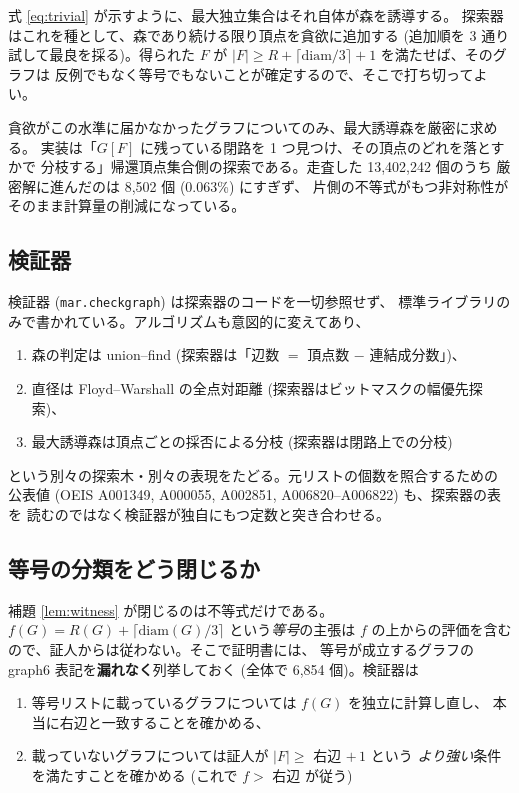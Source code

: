 \documentclass[paper=a4,fontsize=10.5pt,jafontsize=10.5pt]{jlreq}
\theoremstyle{plain}
\theoremstyle{definition}
\begin{document}
式 \eqref{eq:trivial} が示すように、最大独立集合はそれ自体が森を誘導する。
探索器はこれを種として、森であり続ける限り頂点を貪欲に追加する
(追加順を 3 通り試して最良を採る)。得られた $F$ が
$|F| \ge R + \lceil \mathrm{diam}/3 \rceil + 1$ を満たせば、そのグラフは
反例でもなく等号でもないことが確定するので、そこで打ち切ってよい。

貪欲がこの水準に届かなかったグラフについてのみ、最大誘導森を厳密に求める。
実装は「$G[F]$ に残っている閉路を 1 つ見つけ、その頂点のどれを落とすかで
分枝する」帰還頂点集合側の探索である。走査した 13,402,242 個のうち
厳密解に進んだのは 8,502 個 (0.063\%) にすぎず、
片側の不等式がもつ非対称性がそのまま計算量の削減になっている。

\subsection{検証器}

検証器 (\texttt{mar.checkgraph}) は探索器のコードを一切参照せず、
標準ライブラリのみで書かれている。アルゴリズムも意図的に変えてあり、

\begin{enumerate}
\item 森の判定は union--find (探索器は「辺数 $=$ 頂点数 $-$ 連結成分数」)、
\item 直径は Floyd--Warshall の全点対距離 (探索器はビットマスクの幅優先探索)、
\item 最大誘導森は頂点ごとの採否による分枝 (探索器は閉路上での分枝)
\end{enumerate}

という別々の探索木・別々の表現をたどる。元リストの個数を照合するための
公表値 (OEIS A001349, A000055, A002851, A006820--A006822) も、探索器の表を
読むのではなく検証器が独自にもつ定数と突き合わせる。

\subsection{等号の分類をどう閉じるか}\label{sec:eq}

補題 \ref{lem:witness} が閉じるのは不等式だけである。
$f(G) = R(G) + \lceil \mathrm{diam}(G)/3 \rceil$ という\emph{等号}の主張は
$f$ の上からの評価を含むので、証人からは従わない。そこで証明書には、
等号が成立するグラフの graph6 表記を\textbf{漏れなく}列挙しておく
(全体で 6,854 個)。検証器は

\begin{enumerate}
\item 等号リストに載っているグラフについては $f(G)$ を独立に計算し直し、
      本当に右辺と一致することを確かめる、
\item 載っていないグラフについては証人が $|F| \ge$ 右辺 $+\,1$ という
      \emph{より強い}条件を満たすことを確かめる (これで $f > $ 右辺 が従う)
\end{enumerate}
\end{document}
